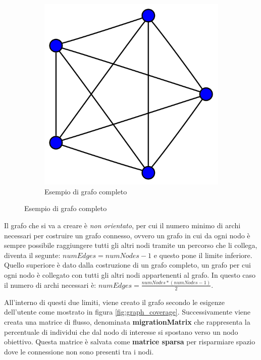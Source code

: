 \begin{figure}[!hb]
\begin{subfigure}[b]{0.45\textwidth}
		\includegraphics[width=\textwidth]{img/4-simplex_graph.svg.png}
		\caption{Esempio di grafo completo}
		\label{fig:complete_graph_example}
	\end{subfigure}
\end{figure}

Il grafo che si va a creare è \emph{non orientato}, per cui il numero minimo di archi necessari 
per costruire un grafo connesso, ovvero un grafo in cui da ogni nodo è sempre possibile raggiungere
tutti gli altri nodi tramite un percorso che li collega, diventa il segunte: $numEdges = numNodes-1$
e questo pone il limite inferiore. Quello superiore è dato dalla costruzione di un grafo completo, 
un grafo per cui ogni nodo è collegato con tutti gli altri nodi appartenenti al grafo. In questo 
caso il numero di archi necessari è: $numEdges = \frac{numNodes*(numNodes-1)}{2}$.

All'interno di questi due limiti, viene creato il grafo secondo le esigenze dell'utente come mostrato 
in figura \ref{fig:graph_coverage}. Successivamente viene creata una matrice di flusso, denominata 
\textbf{migrationMatrix} che rappresenta la percentuale di individui che dal nodo di interesse 
si spostano verso un nodo obiettivo. Questa matrice è salvata come \textbf{matrice sparsa} per 
risparmiare spazio dove le connessione non sono presenti tra i nodi. 

